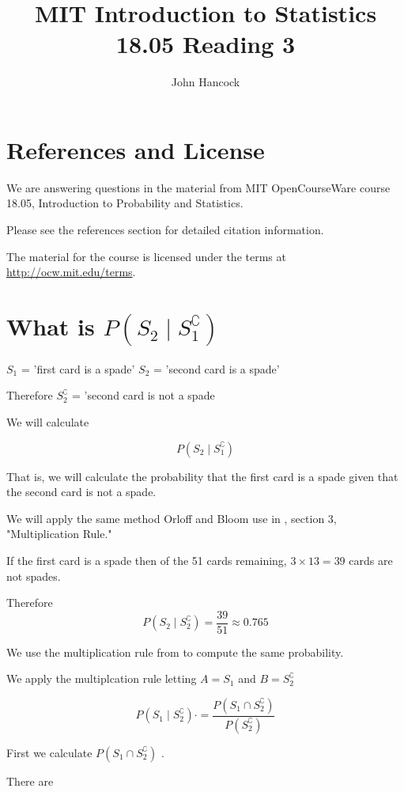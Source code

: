 \documentclass[a4paper,11pt]{article}
\author{John Hancock}
\title{MIT Introduction to Statistics 18.05 Reading 3}
\begin{document}
\maketitle
\tableofcontents
\section{References and License}
We are answering questions in the material from MIT OpenCourseWare
course 18.05, Introduction to Probability and Statistics.

Please see the references section for detailed citation information.

The material for the course is licensed under the terms at 
\url{http://ocw.mit.edu/terms}.

\section{What is $P\left(S_{2} \mid S_{1}^{\complement}\right)$}

$S_{1}$ = 'first card is a spade'
$S_{2}$ = 'second card is a spade'

Therefore $S_{2}^{\complement}$  = 'second card is not a spade

We will calculate

\begin{equation}
  P\left(S_{2} \mid S_{1}^{\complement}\right)
\end{equation}

That is, we will calculate the probability that the first card is a
spade given that the second card is not a spade.

We will apply the same method Orloff and Bloom use in \cite{reading3}, 
section 3, "Multiplication Rule."

If the first card is a spade then of the 51 cards remaining, 
$3 \times 13 = 39$ cards are not spades.

Therefore 
\begin{equation}
  P\left(S_{2} \mid S_{2}^{\complement}\right) = \frac{39}{51}
  \approx 0.765
\end{equation}

We use the multiplication rule from \cite{reading3} 
to compute the same probability.

We apply the multiplcation rule letting $A=S_{1}$ and $B=S_{2}^{\complement}$

\begin{equation}
P\left(S_{1} \mid S_{2}^{\complement}\right) \cdot = 
\frac { 
  P\left(S_{1} \cap S_{2}^{\complement}\right) 
}
{
  P\left(S_{2}^{\complement}\right){}
}
\end{equation}

First we calculate $P\left(S_{1} \cap S_{2}^{\complement}\right)$ .

There are


\printbibliography{}
\end{document}

